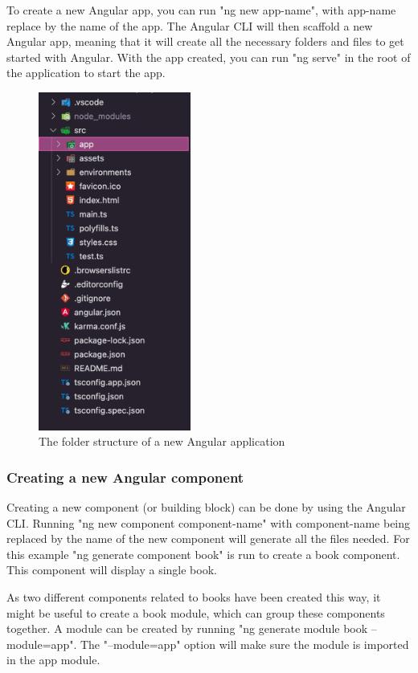 To create a new Angular app, you can run "ng new {app-name}", with {app-name} replace by the name of the app. The Angular CLI will then scaffold a new Angular app, meaning that it will create all the necessary folders and files to get started with Angular. With the app created, you can run "ng serve" in the root of the application to start the app.

\begin{figure}[h]
	\centering
	\includegraphics[width=5cm]{./img/Angular_Structure.png}
	\caption[Angular folder structure]{The folder structure of a new Angular application}
\end{figure}

\subsubsection{Creating a new Angular component}

Creating a new component (or building block) can be done by using the Angular CLI. Running "ng new component {component-name}" with {component-name} being replaced by the name of the new component will generate all the files needed. For this example "ng generate component book" is run to create a book component. This component will display a single book. 

As two different components related to books have been created this way, it might be useful to create a book module, which can group these components together. A module can be created by running "ng generate module book --module=app". The "--module=app" option will make sure the module is imported in the app module. 


